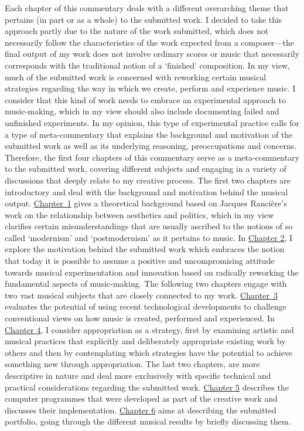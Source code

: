 Each chapter of this commentary deals with a different overarching theme that pertains (in part or as a whole) to the submitted work. I decided to take this approach partly due to the nature of the work submitted, which does not necessarily follow the characteristics of the work expected from a composer---the final output of my work does not involve ordinary scores or music that necessarily corresponds with the traditional notion of a `finished' composition. In my view, much of the submitted work is concerned with reworking certain musical strategies regarding the way in which we create, perform and experience music. I consider that this kind of work needs to embrace an experimental approach to music-making, which in my view should also include documenting failed and unfinished experiments. In my opinion, this type of experimental practice calls for a type of meta-commentary that explains the background and motivation of the submitted work as well as its underlying reasoning, preoccupations and concerns. Therefore, the first four chapters of this commentary serve as a meta-commentary to the submitted work, covering different subjects and engaging in a variety of discussions that deeply relate to my creative process. The first two chapters are introductory and deal with the background and motivation behind the musical output. \hyperlink{chapter1}{\mbox{Chapter 1}} gives a theoretical background based on Jacques Ranci\`{e}re's work on the relationship between aesthetics and politics, which in my view clarifies certain misunderstandings that are usually ascribed to the notions of so called `modernism' and `postmodernism' as it pertains to music. In \hyperlink{chapter2}{Chapter 2}, I explore the motivation behind the submitted work which embraces the notion that today it is possible to assume a positive and uncompromising attitude towards musical experimentation and innovation based on radically reworking the fundamental aspects of music-making. The following two chapters engage with two vast musical subjects that are closely connected to my work. \hyperlink{chapter3}{\mbox{Chapter 3}} evaluates the potential of using recent technological developments to challenge conventional views on how music is created, performed and experienced. In \hyperlink{chapter4}{Chapter 4}, I consider appropriation as a strategy, first by examining artistic and musical practices that explicitly and deliberately appropriate existing work by others and then by contemplating which strategies have the potential to achieve something new through appropriation. The last two chapters, are more descriptive in nature and deal more exclusively with specific technical and practical considerations regarding the submitted work. \hyperlink{chapter5}{Chapter 5} describes the computer programmes that were developed as part of the creative work and discusses their implementation. \hyperlink{chapter6}{Chapter 6} aims at describing the submitted portfolio, going through the different musical results by briefly discussing them.

